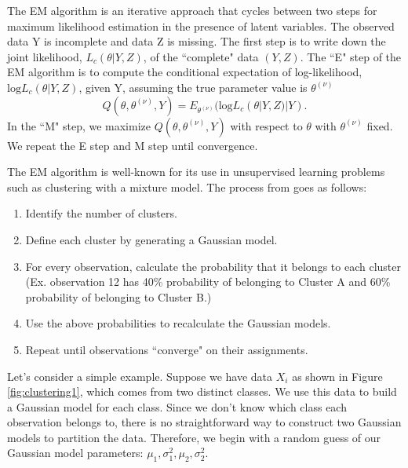 \documentclass[11pt]{article}
\begin{document}
The EM algorithm is an iterative approach that cycles between two steps for maximum likelihood estimation in the presence of latent variables. The observed data Y is incomplete and data Z is missing. The first step is to write down the joint likelihood, $L_c(
\theta|Y,Z)$, of the ``complete" data $(Y,Z)$. The ``E" step of the EM algorithm is to compute the conditional expectation of log-likelihood, $\text{log}L_c(
\theta|Y,Z)$, given Y, assuming the true parameter value is $\theta^{(\nu)}$
\[Q(\theta,\theta^{(\nu)},Y)=E_{\theta^{(\nu)}}(\text{log}L_c(
\theta|Y,Z)|Y).\] In the ``M" step, we maximize $Q(\theta,\theta^{(\nu)},Y)$ with respect to $\theta$ with $\theta^{(\nu)}$ fixed. We repeat the E step and M step until convergence.  

The EM algorithm is well-known for its use in unsupervised learning problems such as clustering with a mixture model. The process from \cite{emclustering} goes as follows:
\begin{enumerate}
    \item Identify the number of clusters. 
    \item Define each cluster by generating a Gaussian model. 
    \item For every observation, calculate the probability that it belongs to each cluster (Ex. observation 12 has 40\% probability of belonging to Cluster A and 60\% probability of belonging to Cluster B.)
    \item Use the above probabilities to recalculate the Gaussian models. 
    \item Repeat until observations ``converge" on their assignments. 
\end{enumerate}

Let's consider a simple example. Suppose we have data $X_i$ as shown in Figure \ref{fig:clustering1}, which comes from two distinct classes. We use this data to build a Gaussian model for each class. Since we don't know which class each observation belongs to, there is no straightforward way to construct two Gaussian models to partition the data. Therefore, we begin with a random guess of our Gaussian model parameters: $\mu_1,\sigma^2_1, \mu_2,\sigma^2_2$. 
\end{document}
